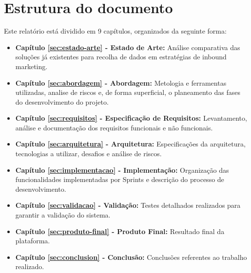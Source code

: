\section{Estrutura do documento}
\label{subsec:estrutura}

Este relatório está dividido em 9 capítulos, organizados da seguinte forma:
\begin{itemize}
	 \item \textbf{Capítulo \ref{sec:estado-arte} - Estado de Arte: }Análise comparativa das soluções já existentes para recolha de dados em estratégias de inbound marketing.
	
	\item \textbf{Capítulo \ref{sec:abordagem} - Abordagem: }Metologia e ferramentas utilizadas, analise de riscos e, de forma superficial, o planeamento das fases do desenvolvimento do projeto.
	
	\item \textbf{Capítulo \ref{sec:requisitos} - Especificação de Requisitos: }Levantamento, análise e documentação dos requisitos funcionais e não funcionais.
	
	\item \textbf{Capítulo \ref{sec:arquitetura} - Arquitetura: }Especificações da arquitetura, tecnologias a utilizar, desafios e análise de riscos.
	
	\item \textbf{Capítulo \ref{sec:implementacao} - Implementação: }Organização das funcionalidades implementadas por Sprints e descrição do processo de desenvolvimento.
	
	\item \textbf{Capítulo \ref{sec:validacao} - Validação: }Testes detalhados realizados para garantir a validação do sistema.
	
	\item \textbf{Capítulo \ref{sec:produto-final} - Produto Final: }Resultado final da plataforma.

	\item \textbf{Capítulo \ref{sec:conclusion} - Conclusão: }Conclusões referentes ao trabalho realizado.
	
\end{itemize}



\blankpage

\glsresetall



